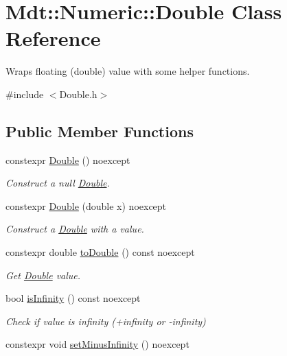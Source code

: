 \hypertarget{class_mdt_1_1_numeric_1_1_double}{}\section{Mdt\+:\+:Numeric\+:\+:Double Class Reference}
\label{class_mdt_1_1_numeric_1_1_double}


Wraps floating (double) value with some helper functions.  




{\ttfamily \#include $<$Double.\+h$>$}

\subsection*{Public Member Functions}
\begin{DoxyCompactItemize}
\item 
constexpr \hyperlink{class_mdt_1_1_numeric_1_1_double_ae340e90c5924e4e38a6c79c4d6ebdd04}{Double} () noexcept
\begin{DoxyCompactList}\small\item\em Construct a null \hyperlink{class_mdt_1_1_numeric_1_1_double}{Double}. \end{DoxyCompactList}\item 
constexpr \hyperlink{class_mdt_1_1_numeric_1_1_double_a3d99ae951bf2716fe59c81e1efa5387a}{Double} (double x) noexcept
\begin{DoxyCompactList}\small\item\em Construct a \hyperlink{class_mdt_1_1_numeric_1_1_double}{Double} with a value. \end{DoxyCompactList}\item 
constexpr double \hyperlink{class_mdt_1_1_numeric_1_1_double_a962b13f89e149e5e7cec93405513479d}{to\+Double} () const noexcept
\begin{DoxyCompactList}\small\item\em Get \hyperlink{class_mdt_1_1_numeric_1_1_double}{Double} value. \end{DoxyCompactList}\item 
bool \hyperlink{class_mdt_1_1_numeric_1_1_double_a72129dd1dd50fdf7503091a3c5881d1a}{is\+Infinity} () const noexcept
\begin{DoxyCompactList}\small\item\em Check if value is infinity (+infinity or -\/infinity) \end{DoxyCompactList}\item 
constexpr void \hyperlink{class_mdt_1_1_numeric_1_1_double_aad324b42829414e760ca305f70a0a692}{set\+Minus\+Infinity} () noexcept

\end{DoxyCompactItemize}
